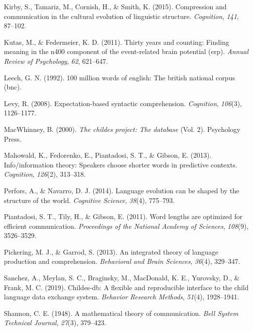 \documentclass[man,floatsintext]{apa6}
\begin{document}
\leavevmode\hypertarget{ref-kirby2015compression}{}%
Kirby, S., Tamariz, M., Cornish, H., \& Smith, K. (2015). Compression and communication in the cultural evolution of linguistic structure. \emph{Cognition}, \emph{141}, 87--102.

\leavevmode\hypertarget{ref-kutas2011}{}%
Kutas, M., \& Federmeier, K. D. (2011). Thirty years and counting: Finding meaning in the n400 component of the event-related brain potential (erp). \emph{Annual Review of Psychology}, \emph{62}, 621--647.

\leavevmode\hypertarget{ref-leech1992}{}%
Leech, G. N. (1992). 100 million words of english: The british national corpus (bnc).

\leavevmode\hypertarget{ref-levy2008}{}%
Levy, R. (2008). Expectation-based syntactic comprehension. \emph{Cognition}, \emph{106}(3), 1126--1177.

\leavevmode\hypertarget{ref-macwhinney2000}{}%
MacWhinney, B. (2000). \emph{The childes project: The database} (Vol. 2). Psychology Press.

\leavevmode\hypertarget{ref-mahowald2013}{}%
Mahowald, K., Fedorenko, E., Piantadosi, S. T., \& Gibson, E. (2013). Info/information theory: Speakers choose shorter words in predictive contexts. \emph{Cognition}, \emph{126}(2), 313--318.

\leavevmode\hypertarget{ref-perfors2014language}{}%
Perfors, A., \& Navarro, D. J. (2014). Language evolution can be shaped by the structure of the world. \emph{Cognitive Science}, \emph{38}(4), 775--793.

\leavevmode\hypertarget{ref-piantadosi2011}{}%
Piantadosi, S. T., Tily, H., \& Gibson, E. (2011). Word lengths are optimized for efficient communication. \emph{Proceedings of the National Academy of Sciences}, \emph{108}(9), 3526--3529.

\leavevmode\hypertarget{ref-pickering2013}{}%
Pickering, M. J., \& Garrod, S. (2013). An integrated theory of language production and comprehension. \emph{Behavioral and Brain Sciences}, \emph{36}(4), 329--347.

\leavevmode\hypertarget{ref-sanchez2019}{}%
Sanchez, A., Meylan, S. C., Braginsky, M., MacDonald, K. E., Yurovsky, D., \& Frank, M. C. (2019). Childes-db: A flexible and reproducible interface to the child language data exchange system. \emph{Behavior Research Methods}, \emph{51}(4), 1928--1941.

\leavevmode\hypertarget{ref-shannon1948}{}%
Shannon, C. E. (1948). A mathematical theory of communication. \emph{Bell System Technical Journal}, \emph{27}(3), 379--423.
\end{document}
